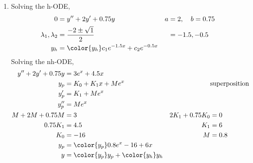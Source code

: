 \begin{enumerate}
    \item Solving the h-ODE,
          \begin{align}
              0                        & = y'' + 2y' + 0.75y                           & a & = 2, \quad b = 0.75 \\
              \lambda_{1}, \lambda_{2} & = \frac{-2 \pm \sqrt{1}}{2}                   &   & = -1.5, -0.5        \\
              y_{h}                    & = \color{y_h} c_{1}e^{-1.5x} + c_{2}e^{-0.5x}
          \end{align}
          Solving the nh-ODE,
          \begin{align}
              y'' + 2y' + 0.75y & = 3e^{x} + 4.5x                                                                         \\
              y_{p}             & = K_{0} + K_{1}x + M e^{x}                  &                    & \text{superposition} \\
              y_{p}'            & = K_{1} + Me^{x}                                                                        \\
              y_{p}''           & = Me^{x}                                                                                \\
              M + 2M + 0.75M    & = 3                                         & 2K_{1} + 0.75K_{0} & = 0                  \\
              0.75K_{1}         & = 4.5                                       & K_{1}              & = 6                  \\
              K_{0}             & = -16                                       & M                  & = 0.8                \\
              y_{p}             & = \color{y_p} 0.8e^{x} -16 + 6x                                                         \\
              y                 & = {\color{y_p} y_{p}} + {\color{y_h} y_{h}}
          \end{align}


\end{enumerate}
